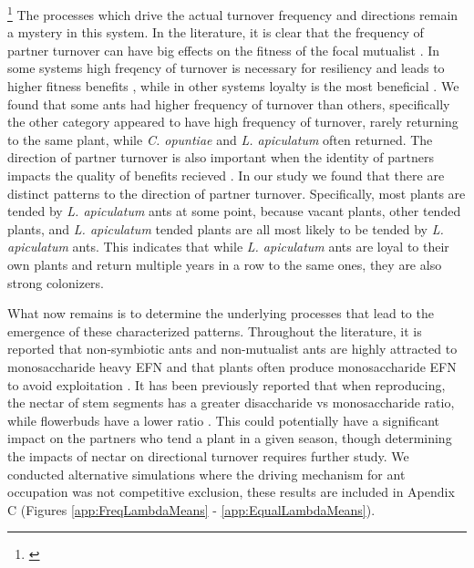 \documentclass[11pt]{article}
\newcommand{\ali}[2]{{\color{blue}{#1}}\footnote{\textit{\color{blue}{#2}}}}
\begin{document}
\ali{}{I could always reframe this to be We see little difference numerically based on ant partner identity, but ants have interesting turnover dynamics or something. Aka do I need to reshape this paragraph more?}
The processes which drive the actual turnover frequency and directions remain a mystery in this system.
In the literature, it is clear that the frequency of partner turnover can have big effects on the fitness of the focal mutualist \cite{Fiala1994, Horvitz1986, Oliveira1999, Sachs2004}.
In some systems high freqency of turnover is necessary for resiliency and leads to higher fitness benefits \cite{Trojelsgaard2015}, while in other systems loyalty is the most beneficial \cite{Batstone2018}.
We found that some ants had higher frequency of turnover than others, specifically the other category appeared to have high frequency of turnover, rarely returning to the same plant, while \textit{C. opuntiae} and \textit{L. apiculatum} often returned.
The direction of partner turnover is also important when the identity of partners impacts the quality of benefits recieved \cite{Fonseca2003, Alonso1998, Dejean2008, Noe1994}.
In our study we found that there are distinct patterns to the direction of partner turnover. 
Specifically, most plants are tended by \textit{L. apiculatum} ants at some point, because vacant plants, other tended plants, and \textit{L. apiculatum} tended plants are all most likely to be tended by \textit{L. apiculatum} ants.
This indicates that while \textit{L. apiculatum} ants are loyal to their own plants and return multiple years in a row to the same ones, they are also strong colonizers. 


What now remains is to determine the underlying processes that lead to the emergence of these characterized patterns. 
Throughout the literature, it is reported that non-symbiotic ants and non-mutualist ants are highly attracted to monosaccharide heavy EFN \citep{Heil2004,Kautz2009} and that plants often produce monosaccharide EFN to avoid exploitation \citep{Heil2010}.
It has been previously reported that when reproducing, the nectar of stem segments has a greater disaccharide vs monosaccharide ratio, while flowerbuds have a lower ratio \citep{Miller2008}. 
This could potentially have a significant impact on the partners who tend a plant in a given season, though determining the impacts of nectar on directional turnover requires further study. 
We conducted alternative simulations where the driving mechanism for ant occupation was not competitive exclusion, these results are included in Apendix C (Figures \ref{app:FreqLambdaMeans} - \ref{app:EqualLambdaMeans}).
\end{document}
